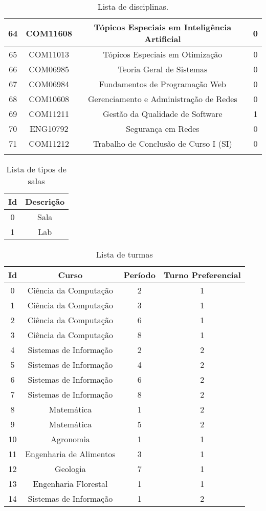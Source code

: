 \begin{apendices}
{\begin{longtable}{|c|c|c|c|}
64 & COM11608 & Tópicos Especiais em Inteligência Artificial & 0 \\ \hline
65 & COM11013 & Tópicos Especiais em Otimização & 0 \\ \hline
66 & COM06985 & Teoria Geral de Sistemas & 0 \\ \hline
67 & COM06984 & Fundamentos de Programação Web & 0 \\ \hline
68 & COM10608 & Gerenciamento e Administração de Redes & 0 \\ \hline
69 & COM11211 & Gestão da Qualidade de Software & 1 \\ \hline
70 & ENG10792 & Segurança em Redes & 0 \\ \hline
71 & COM11212 & Trabalho de Conclusão de Curso I (SI) & 0 \\ \hline
\caption{Lista de disciplinas.\label{ap-lista-discp}}
\end{longtable}
}


\begin{table}[H]
\footnotesize
\centering
\begin{tabular}{|c|c|}
\hline
\textbf{Id} & \textbf{Descrição} \\ \hline
0 & Sala \\ \hline
1 & Lab \\ \hline
\end{tabular}
\caption{Lista de tipos de salas}
\label{ap-lista-tipo-sala}
\end{table}

\begin{table}[H]
\footnotesize
\centering
\begin{tabular}{|c|c|c|c|}
\hline
\textbf{Id} & \textbf{Curso} & \textbf{Período} & \textbf{Turno Preferencial} \\ \hline
0 & Ciência da Computação & 2 & 1 \\ \hline
1 & Ciência da Computação & 3 & 1 \\ \hline
2 & Ciência da Computação & 6 & 1 \\ \hline
3 & Ciência da Computação & 8 & 1 \\ \hline
4 & Sistemas de Informação & 2 & 2 \\ \hline
5 & Sistemas de Informação & 4 & 2 \\ \hline
6 & Sistemas de Informação & 6 & 2 \\ \hline
7 & Sistemas de Informação & 8 & 2 \\ \hline
8 & Matemática & 1 & 2 \\ \hline
9 & Matemática & 5 & 2 \\ \hline
10 & Agronomia & 1 & 1 \\ \hline
11 & Engenharia de Alimentos & 3 & 1 \\ \hline
12 & Geologia & 7 & 1 \\ \hline
13 & Engenharia Florestal & 1 & 1 \\ \hline
14 & Sistemas de Informação & 1 & 2 \\ \hline
\end{tabular}
\caption{Lista de turmas}
\label{ap-lista-turmas}
\end{table}


\end{apendices}
